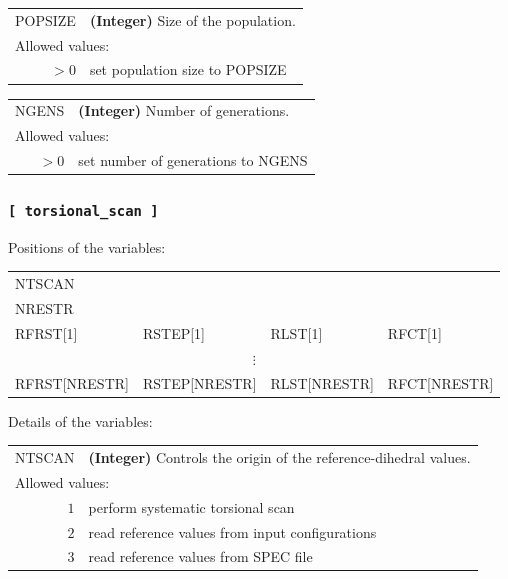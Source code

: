 \documentclass[10pt,a4paper,openany]{memoir}
\numberwithin{equation}{section}
\begin{document}
{
\begin{tabular}{r@{ : }l}
\label{descr:popsize}
   POPSIZE&\textbf{(Integer)} Size of the population.                                                                           \\ 
\multicolumn{2}{l}{Allowed values:} \\ 
    \(>0\)&set population size to POPSIZE                                                                       \\ 
\end{tabular}
\vspace{1ex}
}

{
\begin{tabular}{r@{ : }l}
\label{descr:ngens}
     NGENS&\textbf{(Integer)} Number of generations.                                                             \\ 
\multicolumn{2}{l}{Allowed values:} \\ 
    \(>0\)&set number of generations to NGENS                                                                   \\ 
\end{tabular}
\vspace{1ex}
}

\subsubsection{\texttt{[~torsional\_scan~]}}
\label{sec:inp-torsional_scan}

Positions of the variables:
\begin{center}
  \begin{tabular}{llll}
    NTSCAN &      &      &      \\
    NRESTR &      &      &      \\
    RFRST[1] & RSTEP[1] & RLST[1] & RFCT[1] \\
    \multicolumn{4}{c}{$\vdots$} \\
    RFRST[NRESTR] & RSTEP[NRESTR] & RLST[NRESTR] & RFCT[NRESTR] \\
  \end{tabular}
\end{center}

\noindent Details of the variables:
\vspace{2ex}

{
\begin{tabular}{r@{ : }l}
\label{descr:rfrst}
     NTSCAN&\textbf{(Integer)} Controls the origin of the reference-dihedral values.                \\ 
\multicolumn{2}{l}{Allowed values:} \\ 
\(1\)& perform systematic torsional scan\\ 
\(2\)& read reference values from input configurations\\ 
\(3\)& read reference values from SPEC file\\ 
\end{tabular}
\vspace{1ex}
}
\end{document}

